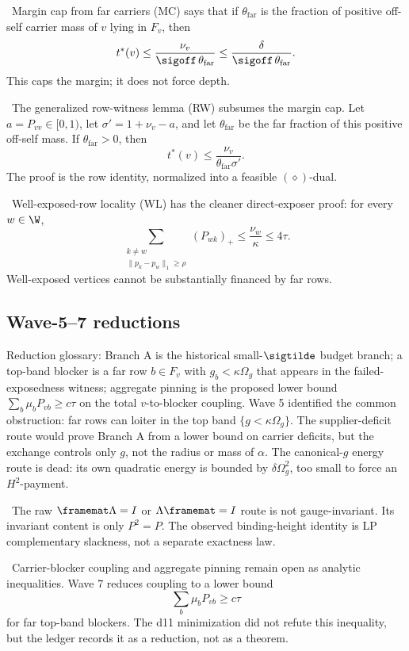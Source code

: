 \begin{lemma}
\provedbadge\ Margin cap from far carriers (MC) says that if \(\theta_{\mathrm{far}}\) is the
fraction of positive off-self
carrier mass of \(v\) lying in \(F_v\), then
\[
  t^*(v)\le \frac{\nu_v}{\sigoff\,\theta_{\mathrm{far}}}
  \le\frac{\delta}{\sigoff\,\theta_{\mathrm{far}}}.
\]
This caps the margin; it does not force depth.
\end{lemma}
\begin{lemma}
\provedbadge\ The generalized row-witness lemma (RW) subsumes the margin cap.  Let
\(a=P_{vv}\in[0,1)\), let
\(\sigma'=1+\nu_v-a\), and let \(\theta_{\mathrm{far}}\) be the far fraction of this positive
off-self mass.  If \(\theta_{\mathrm{far}}>0\), then
\[
  t^*(v)\le\frac{\nu_v}{\theta_{\mathrm{far}}\sigma'}.
\]
The proof is the row identity, normalized into a feasible \((\diamond)\)-dual.
\end{lemma}
\begin{lemma}
\modauditbadge\ Well-exposed-row locality (WL) has the cleaner direct-exposer proof: for
every \(w\in\W\),
\[
  \sum_{\substack{k\ne w\\ \|p_k-p_w\|_1\ge\rho}}(P_{wk})_+
  \le\frac{\nu_w}{\kappa}\le4\tau .
\]
Well-exposed vertices cannot be substantially financed by far rows.
\end{lemma}
\subsection{Wave-5--7 reductions}
Reduction glossary: Branch A is the historical small-\(\sigtilde\) budget
branch; a top-band blocker is a far row \(b\in F_v\) with
\(g_b<\kappa\Omega_g\) that appears in the failed-exposedness witness; aggregate
pinning is the proposed lower bound \(\sum_b\mu_bP_{vb}\ge c\tau\) on the
total \(v\)-to-blocker coupling.
Wave 5 identified the common obstruction: far rows can loiter in the top band
\(\{g<\kappa\Omega_g\}\).  The supplier-deficit route would prove Branch A from a lower
bound on carrier deficits, but the exchange controls only \(g\), not the radius or mass of
\(\alpha\).  The canonical-\(g\) energy route is dead: its own quadratic energy is bounded by
\(\delta\Omega_g^2\), too small to force an \(H^2\)-payment.
\begin{downgradedstatement}
\downgradedbadge\ The raw \(\framemat\Lambda=I\) or \(\Lambda\framemat=I\) route is not
gauge-invariant.  Its invariant content is only \(P^2=P\).  The observed binding-height
identity is LP complementary slackness, not a separate exactness law.
\end{downgradedstatement}
\begin{openproblem}
\openbadge\ Carrier-blocker coupling and aggregate pinning remain open as analytic
inequalities.  Wave 7 reduces coupling to a lower bound
\[
  \sum_b\mu_b P_{vb}\ge c\tau
\]
for far top-band blockers.  The d11 minimization did not refute this inequality, but the
ledger records it as a reduction, not as a theorem.
\end{openproblem}

